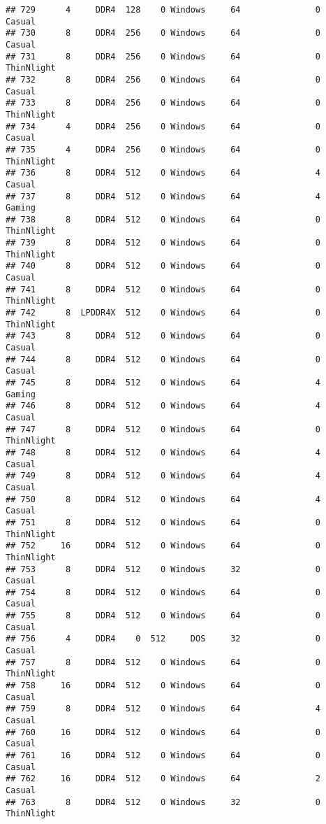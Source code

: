 \documentclass[
]{article}
\begin{document}
\begin{verbatim}
## 729      4     DDR4  128    0 Windows     64               0     Casual
## 730      8     DDR4  256    0 Windows     64               0     Casual
## 731      8     DDR4  256    0 Windows     64               0 ThinNlight
## 732      8     DDR4  256    0 Windows     64               0     Casual
## 733      8     DDR4  256    0 Windows     64               0 ThinNlight
## 734      4     DDR4  256    0 Windows     64               0     Casual
## 735      4     DDR4  256    0 Windows     64               0 ThinNlight
## 736      8     DDR4  512    0 Windows     64               4     Casual
## 737      8     DDR4  512    0 Windows     64               4     Gaming
## 738      8     DDR4  512    0 Windows     64               0 ThinNlight
## 739      8     DDR4  512    0 Windows     64               0 ThinNlight
## 740      8     DDR4  512    0 Windows     64               0     Casual
## 741      8     DDR4  512    0 Windows     64               0 ThinNlight
## 742      8  LPDDR4X  512    0 Windows     64               0 ThinNlight
## 743      8     DDR4  512    0 Windows     64               0     Casual
## 744      8     DDR4  512    0 Windows     64               0     Casual
## 745      8     DDR4  512    0 Windows     64               4     Gaming
## 746      8     DDR4  512    0 Windows     64               4     Casual
## 747      8     DDR4  512    0 Windows     64               0 ThinNlight
## 748      8     DDR4  512    0 Windows     64               4     Casual
## 749      8     DDR4  512    0 Windows     64               4     Casual
## 750      8     DDR4  512    0 Windows     64               4     Casual
## 751      8     DDR4  512    0 Windows     64               0 ThinNlight
## 752     16     DDR4  512    0 Windows     64               0 ThinNlight
## 753      8     DDR4  512    0 Windows     32               0     Casual
## 754      8     DDR4  512    0 Windows     64               0     Casual
## 755      8     DDR4  512    0 Windows     64               0     Casual
## 756      4     DDR4    0  512     DOS     32               0     Casual
## 757      8     DDR4  512    0 Windows     64               0 ThinNlight
## 758     16     DDR4  512    0 Windows     64               0     Casual
## 759      8     DDR4  512    0 Windows     64               4     Casual
## 760     16     DDR4  512    0 Windows     64               0     Casual
## 761     16     DDR4  512    0 Windows     64               0     Casual
## 762     16     DDR4  512    0 Windows     64               2     Casual
## 763      8     DDR4  512    0 Windows     32               0 ThinNlight

\end{verbatim}
\end{document}
